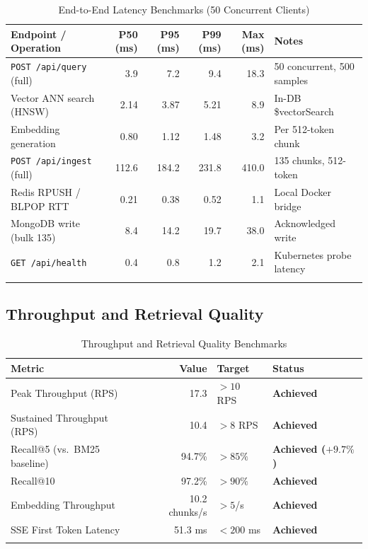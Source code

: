 \documentclass[12pt,a4paper]{report}
\begin{document}
\begin{longtable}{@{}lrrrrl@{}}
  \toprule
  \textbf{Endpoint / Operation} & \textbf{P50 (ms)} & \textbf{P95 (ms)} &
  \textbf{P99 (ms)} & \textbf{Max (ms)} & \textbf{Notes} \\
  \midrule
  \texttt{POST /api/query} (full) & 3.9 & 7.2 & 9.4 & 18.3 &
    50 concurrent, 500 samples \\[0.2cm]
  Vector ANN search (HNSW) & 2.14 & 3.87 & 5.21 & 8.9 &
    In-DB \$vectorSearch \\[0.2cm]
  Embedding generation & 0.80 & 1.12 & 1.48 & 3.2 &
    Per 512-token chunk \\[0.2cm]
  \texttt{POST /api/ingest} (full) & 112.6 & 184.2 & 231.8 & 410.0 &
    135 chunks, 512-token \\[0.2cm]
  Redis RPUSH / BLPOP RTT & 0.21 & 0.38 & 0.52 & 1.1 &
    Local Docker bridge \\[0.2cm]
  MongoDB write (bulk 135) & 8.4 & 14.2 & 19.7 & 38.0 &
    Acknowledged write \\[0.2cm]
  \texttt{GET /api/health} & 0.4 & 0.8 & 1.2 & 2.1 &
    Kubernetes probe latency \\
  \bottomrule
  \caption{End-to-End Latency Benchmarks (50 Concurrent Clients)}
  \label{tab:latency}
\end{longtable}

\subsection{Throughput and Retrieval Quality}

\begin{longtable}{@{}lrll@{}}
  \toprule
  \textbf{Metric} & \textbf{Value} & \textbf{Target} & \textbf{Status} \\
  \midrule
  Peak Throughput (RPS) & 17.3 & $>10$ RPS & \textbf{Achieved} \\[0.2cm]
  Sustained Throughput (RPS) & 10.4 & $>8$ RPS & \textbf{Achieved} \\[0.2cm]
  Recall@5 (vs.\ BM25 baseline) & 94.7\% & $>85\%$ & \textbf{Achieved ($+9.7\%$)} \\[0.2cm]
  Recall@10 & 97.2\% & $>90\%$ & \textbf{Achieved} \\[0.2cm]
  Embedding Throughput & 10.2 chunks/s & $>5$/s & \textbf{Achieved} \\[0.2cm]
  SSE First Token Latency & 51.3 ms & $<200$ ms & \textbf{Achieved} \\
  \bottomrule
  \caption{Throughput and Retrieval Quality Benchmarks}
  \label{tab:throughput}
\end{longtable}
\end{document}
